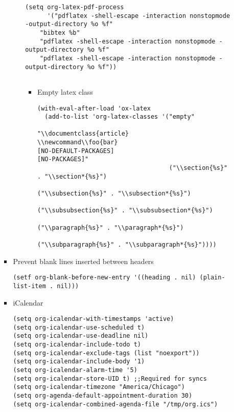 \documentclass{article}
\newcommand\foo{bar}
\begin{document}
\begin{itemize}
\begin{itemize}
\begin{itemize}
\begin{itemize}
\begin{verbatim}
(setq org-latex-pdf-process
      '("pdflatex -shell-escape -interaction nonstopmode -output-directory %o %f"
    "bibtex %b"
    "pdflatex -shell-escape -interaction nonstopmode -output-directory %o %f"
    "pdflatex -shell-escape -interaction nonstopmode -output-directory %o %f"))


\end{verbatim}
\begin{itemize}
\item Empty latex class
\label{sec:orgdbc93a0}
\begin{verbatim}
(with-eval-after-load 'ox-latex
  (add-to-list 'org-latex-classes '("empty"
                                    "\\documentclass{article}
\\newcommand\\foo{bar}
[NO-DEFAULT-PACKAGES]
[NO-PACKAGES]"
                                    ("\\section{%s}" . "\\section*{%s}")
                                    ("\\subsection{%s}" . "\\subsection*{%s}")
                                    ("\\subsubsection{%s}" . "\\subsubsection*{%s}")
                                    ("\\paragraph{%s}" . "\\paragraph*{%s}")
                                    ("\\subparagraph{%s}" . "\\subparagraph*{%s}"))))

\end{verbatim}
\end{itemize}
\end{itemize}

\item Prevent blank lines inserted between headers
\label{sec:orga45ef4d}
\begin{verbatim}
(setf org-blank-before-new-entry '((heading . nil) (plain-list-item . nil)))
\end{verbatim}
\item iCalendar
\label{sec:orgfa71fc0}
\begin{verbatim}
(setq org-icalendar-with-timestamps 'active)
(setq org-icalendar-use-scheduled t)
(setq org-icalendar-use-deadline nil)
(setq org-icalendar-include-todo t)
(setq org-icalendar-exclude-tags (list "noexport"))
(setq org-icalendar-include-body '1)
(setq org-icalendar-alarm-time '5)
(setq org-icalendar-store-UID t) ;;Required for syncs
(setq org-icalendar-timezone "America/Chicago")
(setq org-agenda-default-appointment-duration 30)
(setq org-icalendar-combined-agenda-file "/tmp/org.ics")


\end{verbatim}
\end{itemize}
\end{itemize}
\end{itemize}
\end{document}
